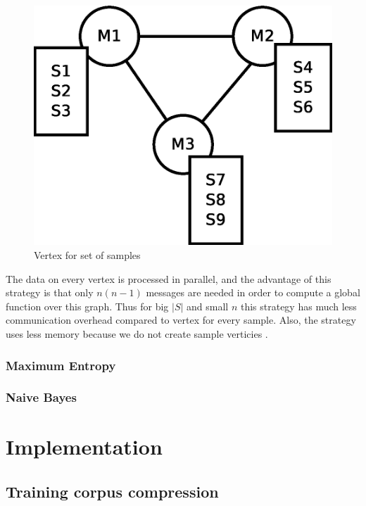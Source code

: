 \documentclass{report}
\begin{document}
\begin{figure}[!htb]
  \centering
  \includegraphics*[scale=0.40]{graph2.eps}
  \caption{Vertex for set of samples}
  \label{fig:vss:graph2}
\end{figure}

The data on every vertex is processed in parallel, and the advantage of this strategy is that only $n(n-1)$ messages are needed in order to compute a global function over this graph. Thus for big $|S|$ and small $n$ this strategy has much less communication overhead compared to vertex for every sample. Also, the strategy uses less memory because we do not create sample verticies .

\subsection{Maximum Entropy}

\subsection{Naive Bayes}

\chapter{Implementation}

\section{Training corpus compression}
\end{document}
